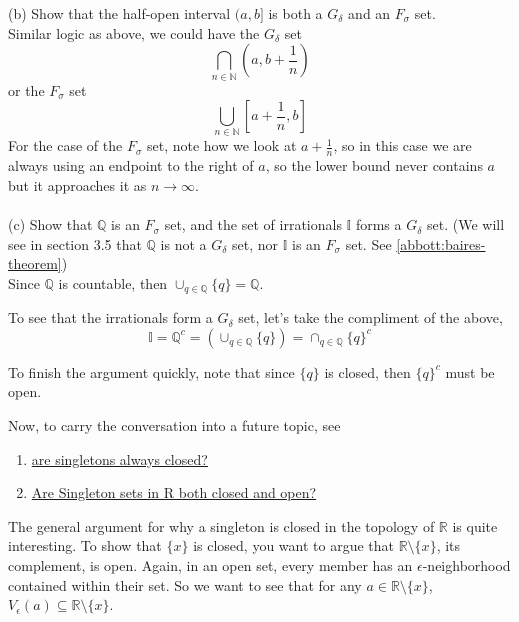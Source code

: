 (b) Show that the half-open interval $(a,b]$ is both a $G_\delta$ and an $F_\sigma$ set.
\\

Similar logic as above, we could have the $G_\delta$ set
$$
\bigcap_{n\in\mathbb{N}} \left( a, b+\frac{1}{n} \right)
$$
or the $F_\sigma$ set
$$
\bigcup_{n\in\mathbb{N}} \left[ a+\frac{1}{n}, b \right]
$$
For the case of the $F_\sigma$ set, note how we look at $a + \frac{1}{n}$, so in this case we are always
using an endpoint to the right of $a$, so the lower bound never contains $a$ but it approaches it as $n\rightarrow\infty$.
\\~\\


(c) Show that $\mathbb{Q}$ is an $F_\sigma$ set, and the set of irrationals $\mathbb{I}$ forms a $G_\delta$ set.
(We will see in section 3.5 that $\mathbb{Q}$ is not a $G_\delta$ set, nor $\mathbb{I}$ is an $F_\sigma$ set.
See \ref{abbott:baires-theorem})
\\

Since $\mathbb{Q}$ is countable, then $\cup_{q\in\mathbb{Q}} \{q\} = \mathbb{Q}$.

To see that the irrationals form a $G_\delta$ set, let's take the compliment of the above,
$$
\mathbb{I} = \mathbb{Q}^c = \left( \cup_{q\in\mathbb{Q}} \{q\}  \right) = \cap_{q\in\mathbb{Q}} \{q\}^c
$$

To finish the argument quickly, note that since $\{q\}$ is closed, then $\{q\}^c$ must be open.

Now, to carry the conversation into a future topic, see
\begin{enumerate}
    \item \href{https://math.stackexchange.com/questions/1459067/are-singletons-always-closed}{are singletons always closed?}
    \item \href{https://math.stackexchange.com/questions/17649/are-singleton-sets-in-mathbbr-both-closed-and-open}{Are Singleton sets in R both closed and open?}
\end{enumerate}

The general argument for why a singleton is closed in the topology of $\mathbb{R}$ is quite interesting.
To show that $\{x\}$ is closed, you want to argue that $\mathbb{R}\setminus\{x\}$, its complement, is open.
Again, in an open set, every member has an $\epsilon$-neighborhood contained within their set.
So we want to see that for any $a\in\mathbb{R}\setminus\{x\}$, $V_\epsilon (a) \subseteq \mathbb{R}\setminus\{x\}$.

